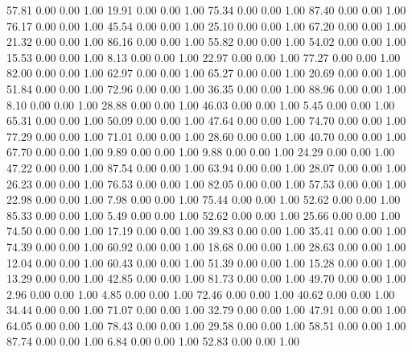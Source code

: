    57.81   0.00   0.00   1.00
   19.91   0.00   0.00   1.00
   75.34   0.00   0.00   1.00
   87.40   0.00   0.00   1.00
   76.17   0.00   0.00   1.00
   45.54   0.00   0.00   1.00
   25.10   0.00   0.00   1.00
   67.20   0.00   0.00   1.00
   21.32   0.00   0.00   1.00
   86.16   0.00   0.00   1.00
   55.82   0.00   0.00   1.00
   54.02   0.00   0.00   1.00
   15.53   0.00   0.00   1.00
    8.13   0.00   0.00   1.00
   22.97   0.00   0.00   1.00
   77.27   0.00   0.00   1.00
   82.00   0.00   0.00   1.00
   62.97   0.00   0.00   1.00
   65.27   0.00   0.00   1.00
   20.69   0.00   0.00   1.00
   51.84   0.00   0.00   1.00
   72.96   0.00   0.00   1.00
   36.35   0.00   0.00   1.00
   88.96   0.00   0.00   1.00
    8.10   0.00   0.00   1.00
   28.88   0.00   0.00   1.00
   46.03   0.00   0.00   1.00
    5.45   0.00   0.00   1.00
   65.31   0.00   0.00   1.00
   50.09   0.00   0.00   1.00
   47.64   0.00   0.00   1.00
   74.70   0.00   0.00   1.00
   77.29   0.00   0.00   1.00
   71.01   0.00   0.00   1.00
   28.60   0.00   0.00   1.00
   40.70   0.00   0.00   1.00
   67.70   0.00   0.00   1.00
    9.89   0.00   0.00   1.00
    9.88   0.00   0.00   1.00
   24.29   0.00   0.00   1.00
   47.22   0.00   0.00   1.00
   87.54   0.00   0.00   1.00
   63.94   0.00   0.00   1.00
   28.07   0.00   0.00   1.00
   26.23   0.00   0.00   1.00
   76.53   0.00   0.00   1.00
   82.05   0.00   0.00   1.00
   57.53   0.00   0.00   1.00
   22.98   0.00   0.00   1.00
    7.98   0.00   0.00   1.00
   75.44   0.00   0.00   1.00
   52.62   0.00   0.00   1.00
   85.33   0.00   0.00   1.00
    5.49   0.00   0.00   1.00
   52.62   0.00   0.00   1.00
   25.66   0.00   0.00   1.00
   74.50   0.00   0.00   1.00
   17.19   0.00   0.00   1.00
   39.83   0.00   0.00   1.00
   35.41   0.00   0.00   1.00
   74.39   0.00   0.00   1.00
   60.92   0.00   0.00   1.00
   18.68   0.00   0.00   1.00
   28.63   0.00   0.00   1.00
   12.04   0.00   0.00   1.00
   60.43   0.00   0.00   1.00
   51.39   0.00   0.00   1.00
   15.28   0.00   0.00   1.00
   13.29   0.00   0.00   1.00
   42.85   0.00   0.00   1.00
   81.73   0.00   0.00   1.00
   49.70   0.00   0.00   1.00
    2.96   0.00   0.00   1.00
    4.85   0.00   0.00   1.00
   72.46   0.00   0.00   1.00
   40.62   0.00   0.00   1.00
   34.44   0.00   0.00   1.00
   71.07   0.00   0.00   1.00
   32.79   0.00   0.00   1.00
   47.91   0.00   0.00   1.00
   64.05   0.00   0.00   1.00
   78.43   0.00   0.00   1.00
   29.58   0.00   0.00   1.00
   58.51   0.00   0.00   1.00
   87.74   0.00   0.00   1.00
    6.84   0.00   0.00   1.00
   52.83   0.00   0.00   1.00
